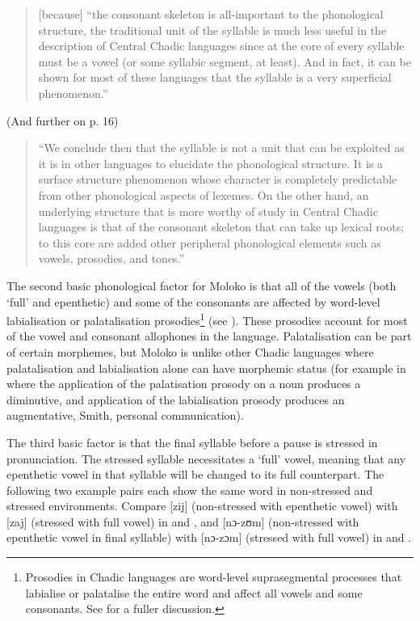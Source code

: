 \begin{quote}
[because] “the consonant skeleton is all-important to the phonological structure, the traditional unit of the syllable is much less useful in the description of Central Chadic languages since at the core of every syllable must be a vowel (or some syllabic segment, at least). And in fact, it can be shown for most of these languages that the syllable is a very superficial phenomenon.”
\end{quote}

(And further on p. 16) 

\begin{quote}
“We conclude then that the syllable is not a unit that can be exploited as it is in other languages to elucidate the phonological  structure. It is a surface structure phenomenon whose character is completely predictable from other phonological aspects of lexemes. On the other hand, an underlying structure that is more worthy of study in Central Chadic languages is that of the consonant skeleton that can take up lexical roots; to this core are added other peripheral phonological elements such as vowels, prosodies, and tones.”
\end{quote}

The second basic phonological factor for Moloko is that all of the vowels (both ‘full’ and epenthetic) and some of the consonants are affected by word-level labialisation or palatalisation prosodies\footnote{Prosodies in Chadic languages are word-level suprasegmental processes that labialise or palatalise the entire word and affect all vowels and some consonants. See \citet{Roberts2001} for a fuller discussion.} (see ). These prosodies account for most of the vowel and consonant allophones in the language. Palatalisation can be part of certain morphemes, but Moloko is unlike other Chadic languages where palatalisation and labialisation alone can have morphemic status (for example in  where the application of the palatisation prosody on a noun produces a diminutive, and application of the labialisation prosody produces an augmentative, Smith, personal communication).

The third basic factor is that the final syllable before a pause is stressed in pronunciation. The stressed syllable necessitates a ‘full’ vowel, meaning that any epenthetic vowel in that syllable will be changed to its full counterpart.  The following two example pairs each show the same word in non-stressed and stressed environments. Compare [zij] (non-stressed with epenthetic vowel) with [zaj] (stressed with full vowel) in  and , and [nɔ-zʊm] (non-stressed with epenthetic vowel in final syllable) with [nɔ-zɔm] (stressed with full vowel) in  and . 


